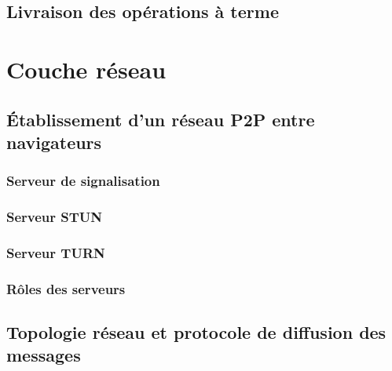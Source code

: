 \subsection{Livraison des opérations à terme}


\section{Couche réseau}


\subsection{Établissement d'un réseau \ac{P2P} entre navigateurs}


\subsubsection{Serveur de signalisation}


\subsubsection{Serveur STUN}


\subsubsection{Serveur TURN}


\subsubsection{Rôles des serveurs}


\subsection{Topologie réseau et protocole de diffusion des messages}



